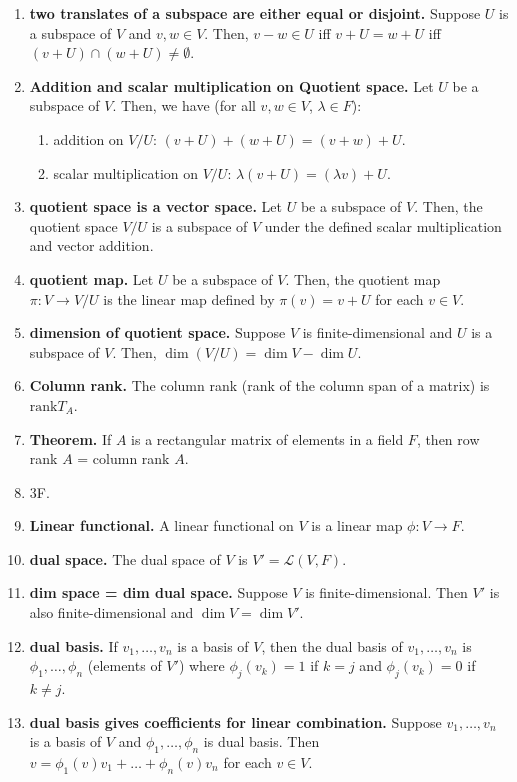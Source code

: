 \begin{enumerate}
	\item \textbf{two translates of a subspace are either equal or disjoint. } Suppose $U$ is a subspace of $V$ and $v,w \in V$. Then, $v-w \in U$ iff $v + U = w + U$ iff $(v + U) \cap (w+U) \neq \emptyset$. 
	\item \textbf{Addition and scalar multiplication on Quotient space. } Let $U$ be a subspace of $V$. Then, we have (for all $v,w \in V$, $\lambda \in F$): 
	\begin{enumerate}
		\item addition on $V/U$: $(v + U) + (w + U) = (v+w) + U$. 
		\item scalar multiplication on $V/U$: $\lambda(v + U) = (\lambda v) + U$. 
	\end{enumerate}
	\item \textbf{quotient space is a vector space. } Let $U$ be a subspace of $V$. Then, the quotient space $V/U$ is a subspace of $V$ under the defined scalar multiplication and vector addition. 
	\item \textbf{quotient map. } Let $U$ be a subspace of $V$. Then, the quotient map $\pi: V \to V/U$ is the linear map defined by $\pi(v) = v + U$ for each $v \in V$. 
	\item \textbf{dimension of quotient space. } Suppose $V$ is finite-dimensional and $U$ is a subspace of $V$. Then, $\dim (V/U) = \dim V - \dim U$.
	\item \textbf{Column rank. } The column rank (rank of the column span of a matrix) is $\textrm{rank}T_A$. 
	\item \textbf{Theorem. } If $A$ is a rectangular matrix of elements in a field $F$, then row rank $A$ = column rank $A$. 
	\item 3F. 
	\item \textbf{Linear functional. } A linear functional on $V$ is a linear map $\phi: V \to F$. 
	\item \textbf{dual space. } The dual space of $V$ is $V' = \mathscr{L}(V, F)$. 
	\item \textbf{dim space = dim dual space. } Suppose $V$ is finite-dimensional. Then $V'$ is also finite-dimensional and $\dim V = \dim V'$. 
	\item \textbf{dual basis. } If $v_1,\dots, v_n$ is a basis of $V$, then the dual basis of $v_1,\dots,v_n$ is $\phi_1,\dots,\phi_n$ (elements of $V'$) where $\phi_j(v_k) = 1$ if $k=j$ and $\phi_j(v_k)=0$ if $k \neq j$. 
	\item \textbf{dual basis gives coefficients for linear combination. } Suppose $v_1,\dots,v_n$ is a basis of $V$ and $\phi_1,\dots,\phi_n$ is dual basis. Then $v=\phi_1(v)v_1 + \dots + \phi_n(v)v_n$ for each $v \in V$. 

\end{enumerate}
